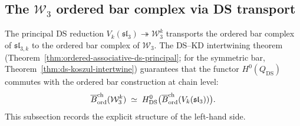\subsection{The \texorpdfstring{$\mathcal{W}_3$}{W\_3} ordered bar complex via DS transport}
\label{subsec:w3-ordered-bar-ds}

The principal DS reduction $V_k(\mathfrak{sl}_3) \twoheadrightarrow
\mathcal{W}_3^k$ transports the ordered bar complex of
$\widehat{\mathfrak{sl}}_{3,k}$ to the ordered bar complex of
$\mathcal{W}_3$. The DS--KD intertwining theorem
(Theorem~\ref{thm:ordered-associative-ds-principal}; for the symmetric
bar, Theorem~\ref{thm:ds-koszul-intertwine}) guarantees that the
functor $H^0(Q_{\mathrm{DS}})$ commutes with the ordered bar
construction at chain level:
\begin{equation}\label{eq:w3-ordered-bar-ds}
\overline{B}^{\mathrm{ch}}_{\mathrm{ord}}(\mathcal{W}_3^k)
\;\simeq\;
H^0_{\mathrm{DS}}\bigl(\overline{B}^{\mathrm{ch}}_{\mathrm{ord}}(V_k(\mathfrak{sl}_3))\bigr).
\end{equation}
This subsection records the explicit structure of the left-hand side.

